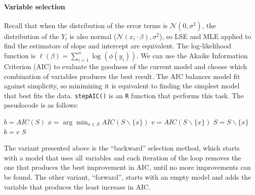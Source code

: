 \paragraph{Variable selection}
Recall that when the distribution of the error terms is $\mathcal{N}(0, \sigma^2)$, the distribution of the $Y_i$ is also normal ($\mathcal{N}(x_i \cdot \beta), \sigma^2$), so LSE and MLE applied to find the estimators of slope and intercept are equivalent. The log-likelihood function is $\ell(\beta) = \sum_{i=1}^n \log(\phi(y_i))$. We can use the Akaike Information Criterion (AIC) to evaluate the goodness of the current model and choose which combination of variables produces the best result. The AIC balances model fit against simplicity, so minimizing it is equivalent to finding the simplest model that best fits the data. \texttt{stepAIC()} is an \texttt{R} function that performs this task. The pseudocode is as follows:
\begin{algorithm}
    \begin{algorithmic}
            \State $b = AIC(S)$
                \State $x = \arg\min_{x \in S} AIC(S \backslash \{x\})$
                \State $v = AIC(S \backslash \{x\})$
                    \State $S = S \backslash \{x\}$
                    \State $b = v$
                \EndIf
            \EndWhile
            \State\Return $S$
        \EndFunction
    \end{algorithmic}
\end{algorithm}
The variant presented above is the ``backward'' selection method, which starts with a model that uses all variables and each iteration of the loop removes the one that produces the best improvement in AIC, until no more improvements can be found. The other variant, ``forward'', starts with an empty model and adds the variable that produces the least increase in AIC.

